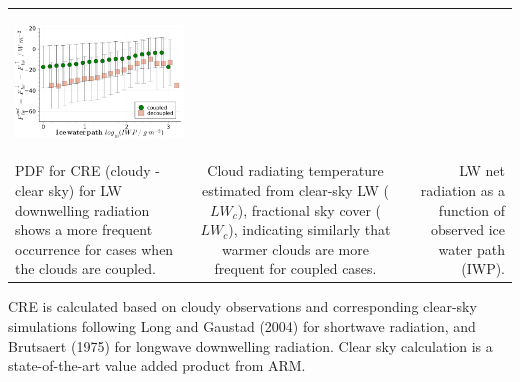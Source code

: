 \documentclass[portrate,paperwidth=841mm,paperheight=1189mm,fontscale=0.4,margin=1cm]{baposter}
\begin{document}
\begin{poster}
{\begin{tabular}{@{}lcr@{}}
\begin{minipage}{0.31\linewidth}
\begin{center}
		\includegraphics[width=.93\linewidth]{Fnet_vs_IWP_both.png}
	\end{center}
\end{minipage} \\
	\begin{minipage}{0.3\linewidth}
		PDF for CRE (cloudy - clear sky) for LW downwelling radiation shows a more frequent occurrence for cases when the clouds are coupled.
	\end{minipage} 
	&
	\begin{minipage}{0.3\linewidth}
		Cloud radiating temperature estimated from clear-sky LW ($LW_c$), fractional sky cover ($LW_c$), indicating similarly that warmer clouds are more frequent for coupled cases.
	\end{minipage}
	&
	\begin{minipage}{0.3\linewidth}
		LW net radiation as a function of observed ice water path (IWP).
	\end{minipage}
	\\		
\end{tabular}

CRE is calculated based on cloudy observations and corresponding clear-sky simulations following Long and Gaustad (2004) for shortwave radiation, and Brutsaert (1975) for longwave downwelling radiation. Clear sky calculation is a state-of-the-art value added product from ARM.
   
}


\end{poster}
\end{document}
